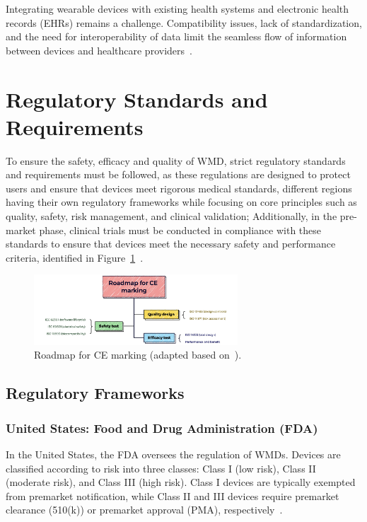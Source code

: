 \documentclass[journal]{IEEEtran}
\begin{document}
        Integrating wearable devices with existing health systems and electronic health records (EHRs) remains a challenge. Compatibility issues, lack of standardization, and the need for interoperability of data limit the seamless flow of information between devices and healthcare providers~\cite{Ravizza2019}.

\section{Regulatory Standards and Requirements}
\label{8.Regulatory}

To ensure the safety, efficacy and quality of WMD, strict regulatory standards and requirements must be followed, as these regulations are designed to protect users and ensure that devices meet rigorous medical standards, different regions having their own regulatory frameworks while focusing on core principles such as quality, safety, risk management, and clinical validation; Additionally, in the pre-market phase, clinical trials must be conducted in compliance with these standards to ensure that devices meet the necessary safety and performance criteria, identified in Figure~\ref{fig:roadmap}~\cite{Ravizza2019,EuropeanUnion2024,Dias2018}.

\begin{figure}[!t]
\centering
\includegraphics[width=3in]{Figuras/Roadmap for CE marking.jpeg}
\caption{Roadmap for CE marking (adapted based on~\cite{Ravizza2019}).}
\label{fig:roadmap}
\end{figure}

    \subsection{Regulatory Frameworks}

        \subsubsection{United States: Food and Drug Administration (FDA)}

        In the United States, the FDA oversees the regulation of WMDs. Devices are classified according to risk into three classes: Class I (low risk), Class II (moderate risk), and Class III (high risk). Class I devices are typically exempted from premarket notification, while Class II and III devices require premarket clearance (510(k)) or premarket approval (PMA), respectively~\cite{Dias2018,Ravizza2019}.
\end{document}
